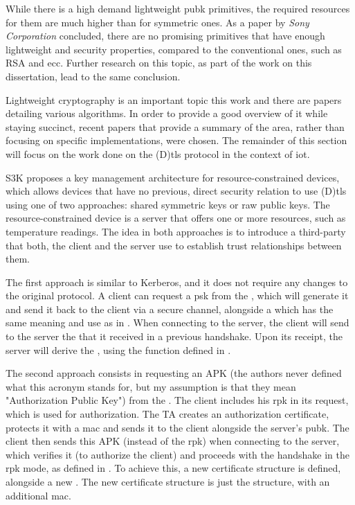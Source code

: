 \documentclass{llncs}
\begin{document}
{While there is a high demand lightweight \gls{pubk} primitives, the required
resources for them are much higher than for symmetric ones. As a
paper by \textit{Sony Corporation}\cite{b5b8db9716:online}
concluded, there are no promising primitives
that have enough lightweight and security properties, compared to the
conventional ones, such as RSA and \gls{ecc}. Further research on this topic, as part of the work on this dissertation, lead to the same conclusion.

Lightweight cryptography is an important topic this work and there are papers detailing
various algorithms. In order to provide a good overview of it while staying succinct, recent papers that provide a summary of the
area, rather than focusing on specific implementations, were chosen.
The remainder of this section will focus on the work done on the (D)\gls{tls} protocol in the context of \gls{iot}.

S3K\cite{S3KScala62:online} proposes a key management architecture for resource-constrained devices,
which allows devices that have no previous, direct security relation to use
(D)\gls{tls} using one of two approaches: shared symmetric keys or raw public keys.
The resource-constrained device is a server that offers one or more resources,
such as temperature readings. The idea in both approaches is to introduce a third-party
 that both, the client and the server use to establish
trust relationships between them.

The first approach is similar to Kerberos\cite{RFC4120}, and it does not require any
changes to the original protocol. A client can request a \gls{psk}  from the ,
which will generate it and send it back to the client via a secure channel, alongside
a  which has the same meaning and use as in \cite{RFC4279}. When connecting to the server,
the client will send to the server the  that it received in a previous
handshake. Upon its receipt, the server will derive the , using the
 function defined in \cite{RFC5246}.

The second approach consists in requesting an APK (the authors never defined
what this acronym stands for, but my assumption is that they mean "Authorization Public Key")
from the . The client includes his \gls{rpk} in its request, which is used for authorization. The TA
creates an authorization certificate, protects it with a \gls{mac} and sends it
to the client alongside the server's \gls{pubk}.
The client then sends this APK (instead of the \gls{rpk})
when connecting to the server, which verifies it (to authorize the client)
and proceeds with the handshake in the \gls{rpk} mode, as defined in  \cite{RFC4279}.
To achieve this, a new certificate structure is defined, alongside a new .
The new certificate structure is just the  \cite{RFC7250} structure, with an
additional \gls{mac}.

}
\end{document}
